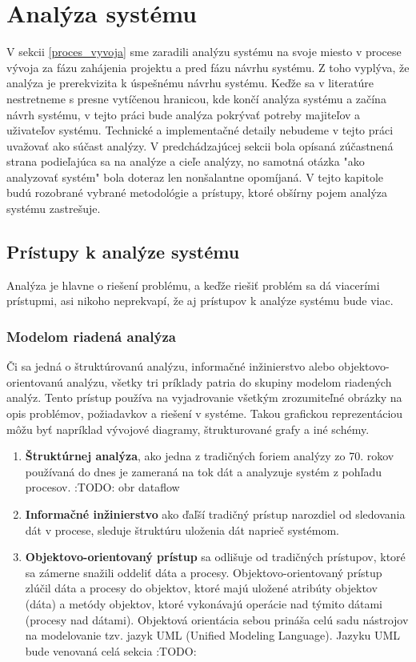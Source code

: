 \section{Analýza systému}
 V sekcii \ref{proces_vyvoja} sme zaradili analýzu systému na svoje miesto v procese vývoja za fázu zahájenia projektu a pred fázu návrhu systému. Z toho vyplýva, že analýza je prerekvizita k úspešnému návrhu systému. Keďže sa v literatúre nestretneme s presne vytíčenou hranicou, kde končí analýza systému a začína návrh systému, v tejto práci bude analýza pokrývať potreby majiteľov a uživateľov systému. Technické a implementačné detaily nebudeme v tejto práci uvažovať ako súčast analýzy. V predchádzajúcej sekcii bola opísaná zúčastnená strana podieľajúca sa na analýze a cieľe analýzy, no samotná otázka "ako analyzovať systém" bola doteraz len nonšalantne opomíjaná. V tejto kapitole budú rozobrané vybrané metodológie a prístupy, ktoré obšírny pojem analýza systému zastrešuje.
 
 \subsection{Prístupy k analýze systému}
Analýza je hlavne o riešení problému, a keďže riešiť problém sa dá viacerími prístupmi, asi nikoho neprekvapí, že aj prístupov k analýze systému bude viac.

\subsubsection{Modelom riadená analýza}
Či sa jedná o štruktúrovanú analýzu, informačné inžinierstvo alebo objektovo-orientovanú analýzu, všetky tri príklady patria do skupiny modelom riadených analýz. Tento prístup používa na vyjadrovanie všetkým zrozumiteľné obrázky na opis problémov, požiadavkov a riešení v systéme. Takou grafickou reprezentáciou môžu byť napríklad vývojové diagramy, štrukturované grafy a iné schémy.

\begin{enumerate}
	\item \textbf{Štruktúrnej analýza}, ako jedna z tradičných foriem analýzy zo 70. rokov používaná do dnes je zameraná na tok dát a analyzuje systém z pohľadu procesov. :TODO: obr dataflow
	\item \textbf{Informačné inžinierstvo} ako ďaľší tradičný prístup narozdiel od sledovania dát v procese, sleduje štruktúru uloženia dát naprieč systémom.
	\item \textbf{Objektovo-orientovaný prístup} sa odlišuje od tradičných prístupov, ktoré sa zámerne snažili oddeliť dáta a procesy. Objektovo-orientovaný prístup zlúčil dáta a procesy do objektov, ktoré majú uložené atribúty objektov (dáta) a metódy objektov, ktoré vykonávajú operácie nad týmito dátami (procesy nad dátami). Objektová orientácia sebou prináša celú sadu nástrojov na modelovanie tzv. jazyk UML (Unified Modeling Language). Jazyku UML bude venovaná celá sekcia :TODO:
\end{enumerate}

